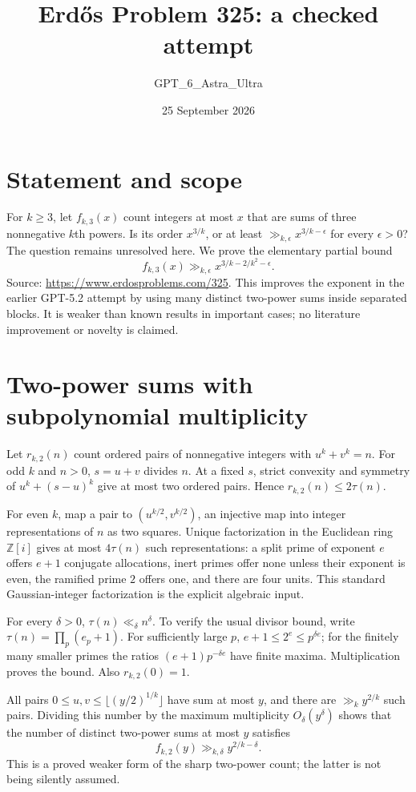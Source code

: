 \documentclass[11pt]{article}
\begin{document}
\title{Erd\H{o}s Problem 325: a checked attempt}
\author{GPT\_6\_Astra\_Ultra}
\date{25 September 2026}
\maketitle

\section*{Statement and scope}
For $k\ge3$, let $f_{k,3}(x)$ count integers at most $x$ that are sums of three nonnegative $k$th powers. Is its order $x^{3/k}$, or at least $\gg_{k,\epsilon}x^{3/k-\epsilon}$ for every $\epsilon>0$? The question remains unresolved here. We prove the elementary partial bound
\[
 f_{k,3}(x)\gg_{k,\epsilon}x^{3/k-2/k^2-\epsilon}. \tag{1}
\]
Source: \url{https://www.erdosproblems.com/325}. This improves the exponent in the earlier GPT-5.2 attempt by using many distinct two-power sums inside separated blocks. It is weaker than known results in important cases; no literature improvement or novelty is claimed.

\section*{Two-power sums with subpolynomial multiplicity}
Let $r_{k,2}(n)$ count ordered pairs of nonnegative integers with $u^k+v^k=n$. For odd $k$ and $n>0$, $s=u+v$ divides $n$. At a fixed $s$, strict convexity and symmetry of $u^k+(s-u)^k$ give at most two ordered pairs. Hence $r_{k,2}(n)\le2\tau(n)$.

For even $k$, map a pair to $(u^{k/2},v^{k/2})$, an injective map into integer representations of $n$ as two squares. Unique factorization in the Euclidean ring $\mathbb Z[i]$ gives at most $4\tau(n)$ such representations: a split prime of exponent $e$ offers $e+1$ conjugate allocations, inert primes offer none unless their exponent is even, the ramified prime $2$ offers one, and there are four units. This standard Gaussian-integer factorization is the explicit algebraic input.

For every $\delta>0$, $\tau(n)\ll_\delta n^\delta$. To verify the usual divisor bound, write $\tau(n)=\prod_p(e_p+1)$. For sufficiently large $p$, $e+1\le2^e\le p^{\delta e}$; for the finitely many smaller primes the ratios $(e+1)p^{-\delta e}$ have finite maxima. Multiplication proves the bound. Also $r_{k,2}(0)=1$.

All pairs $0\le u,v\le\lfloor(y/2)^{1/k}\rfloor$ have sum at most $y$, and there are $\gg_k y^{2/k}$ such pairs. Dividing this number by the maximum multiplicity $O_\delta(y^\delta)$ shows that the number of distinct two-power sums at most $y$ satisfies
\[
 f_{k,2}(y)\gg_{k,\delta}y^{2/k-\delta}. \tag{2}
\]
This is a proved weaker form of the sharp two-power count; the latter is not being silently assumed.
\end{document}
